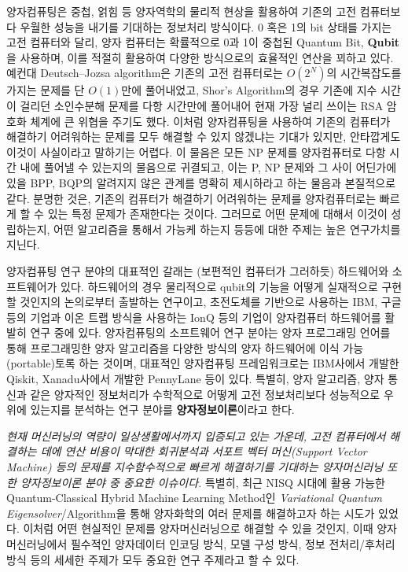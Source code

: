 \quad 양자컴퓨팅은 중첩, 얽힘 등 양자역학의 물리적 현상을 활용하여 기존의 고전 컴퓨터보다 우월한 성능을 내기를 기대하는 정보처리 방식이다.\cite{park_kias_horizon_2024} 0 혹은 1의 bit 상태를 가지는 고전 컴퓨터와 달리, 양자 컴퓨터는 확률적으로 0과 1이 중첩된 Quantum Bit, \textbf{Qubit}을 사용하며, 이를 적절히 활용하여 다양한 방식으로의 효율적인 연산을 꾀하고 있다. 예컨대 Deutsch–Jozsa algorithm은 기존의 고전 컴퓨터로는 \( O(2^N) \)의 시간복잡도를 가지는 문제를 단 \( O(1) \)만에 풀어내었고, Shor's Algorithm의 경우 기존에 지수 시간이 걸리던 소인수분해 문제를 다항 시간만에 풀어내어 현재 가장 널리 쓰이는 RSA 암호화 체계에 큰 위협을 주기도 했다. 이처럼 양자컴퓨팅을 사용하여 기존의 컴퓨터가 해결하기 어려워하는 문제를 모두 해결할 수 있지 않겠냐는 기대가 있지만, 안타깝게도 이것이 사실이라고 말하기는 어렵다. 이 물음은 모든 NP 문제를 양자컴퓨터로 다항 시간 내에 풀어낼 수 있는지의 물음으로 귀결되고, 이는 P, NP 문제와 그 사이 어딘가에 있을 BPP, BQP의 알려지지 않은 관계를 명확히 제시하라고 하는 물음과 본질적으로 같다. 분명한 것은, 기존의 컴퓨터가 해결하기 어려워하는 문제를 양자컴퓨터로는 빠르게 할 수 있는 특정 문제가 존재한다는 것이다. 그러므로 어떤 문제에 대해서 이것이 성립하는지, 어떤 알고리즘을 통해서 가능케 하는지 등등에 대한 주제는 높은 연구가치를 지닌다.

양자컴퓨팅 연구 분야의 대표적인 갈래는 (보편적인 컴퓨터가 그러하듯) 하드웨어와 소프트웨어가 있다. 하드웨어의 경우 물리적으로 qubit의 기능을 어떻게 실재적으로 구현할 것인지의 논의로부터 출발하는 연구이고, 초전도체를 기반으로 사용하는 IBM, 구글 등의 기업과 이온 트랩 방식을 사용하는 IonQ 등의 기업이 양자컴퓨터 하드웨어를 활발히 연구 중에 있다. 양자컴퓨팅의 소프트웨어 연구 분야는 양자 프로그래밍 언어를 통해 프로그래밍한 양자 알고리즘을 다양한 방식의 양자 하드웨어에 이식 가능(portable)토록 하는 것이며, 대표적인 양자컴퓨팅 프레임워크로는 IBM사에서 개발한 Qiskit, Xanadu사에서 개발한 PennyLane 등이 있다. 특별히, 양자 알고리즘, 양자 통신과 같은 양자적인 정보처리가 수학적으로 어떻게 고전 정보처리보다 성능적으로 우위에 있는지를 분석하는 연구 분야를 \textbf{양자정보이론}이라고 한다.

\textit{현재 머신러닝의 역량이 일상생활에서까지 입증되고 있는 가운데, 고전 컴퓨터에서 해결하는 데에 연산 비용이 막대한 회귀분석과 서포트 벡터 머신(Support Vector Machine) 등의 문제를 지수함수적으로 빠르게 해결하기를 기대하는 양자머신러닝 또한 양자정보이론 분야 중 중요한 이슈이다. } 특별히, 최근 NISQ 시대에 활용 가능한 Quantum-Classical Hybrid Machine Learning Method인 \textit{Variational Quantum Eigensolver}/Algorithm을 통해 양자화학의 여러 문제를 해결하고자 하는 시도가 있었다. 이처럼 어떤 현실적인 문제를 양자머신러닝으로 해결할 수 있을 것인지, 이때 양자머신러닝에서 필수적인 양자데이터 인코딩 방식, 모델 구성 방식, 정보 전처리/후처리 방식 등의 세세한 주제가 모두 중요한 연구 주제라고 할 수 있다.

